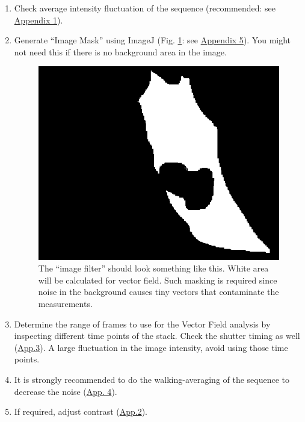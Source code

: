 \documentclass{article}
\begin{document}
\begin{enumerate}
\def\labelenumi{\arabic{enumi}.}
\item
  Check average intensity fluctuation of the sequence (recommended: see
  \hyperref[app1]{Appendix 1}).
\item
  Generate ``Image Mask'' using ImageJ (Fig. \ref{fig:imageMask}: see
  \hyperref[app5]{Appendix 5}). You might not need this if there is no
  background area in the image.

\begin{figure}[!ht]
\begin{center}
\includegraphics[scale=0.4]{img/image023.png}
\caption{ The ``image filter'' should look something like this. White area
  will be calculated for vector field. Such masking is required since
  noise in the background causes tiny vectors that contaminate the
  measurements.}
\label{fig:imageMask}
\end{center}
\end{figure}


\item
  Determine the range of frames to use for the Vector Field analysis by
  inspecting different time points of the stack. Check the shutter
  timing as well (\hyperref[app3]{App.3}). A large fluctuation in the
  image intensity, avoid using those time points.
\item
  It is strongly recommended to do the walking-averaging of the sequence
  to decrease the noise (\hyperref[app4]{App. 4}).
\item
  If required, adjust contrast (\hyperref[app2]{App.2}).
\end{enumerate}
\end{document}

